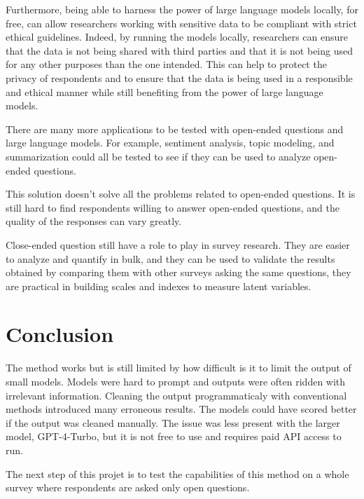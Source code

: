 \documentclass[
  authoryear,
  preprint,
  3p]{elsarticle}
\begin{document}
Furthermore, being able to harness the power of large language models
locally, for free, can allow researchers working with sensitive data to
be compliant with strict ethical guidelines. Indeed, by running the
models locally, researchers can ensure that the data is not being shared
with third parties and that it is not being used for any other purposes
than the one intended. This can help to protect the privacy of
respondents and to ensure that the data is being used in a responsible
and ethical manner while still benefiting from the power of large
language models.

There are many more applications to be tested with open-ended questions
and large language models. For example, sentiment analysis, topic
modeling, and summarization could all be tested to see if they can be
used to analyze open-ended questions.

This solution doesn't solve all the problems related to open-ended
questions. It is still hard to find respondents willing to answer
open-ended questions, and the quality of the responses can vary greatly.

Close-ended question still have a role to play in survey research. They
are easier to analyze and quantify in bulk, and they can be used to
validate the results obtained by comparing them with other surveys
asking the same questions, they are practical in building scales and
indexes to measure latent variables.

\section{Conclusion}\label{conclusion}

The method works but is still limited by how difficult is it to limit
the output of small models. Models were hard to prompt and outputs were
often ridden with irrelevant information. Cleaning the output
programmaticaly with conventional methods introduced many erroneous
results. The models could have scored better if the output was cleaned
manually. The issue was less present with the larger model, GPT-4-Turbo,
but it is not free to use and requires paid API access to run.

The next step of this projet is to test the capabilities of this method
on a whole survey where respondents are asked only open questions.

\newpage{}


\renewcommand\refname{References}
  
\end{document}
